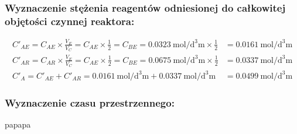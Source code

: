 \documentclass[11pt]{article}
\begin{document}
\subsubsection{Wyznaczenie stężenia reagentów odniesionej do całkowitej objętości czynnej reaktora:}
\begin{align}
{C'}_{AE}=C_{AE}\times\frac{V_E}{V_C}=C_{AE}\times\frac{1}{2}=C_{BE}=\SI{0.0323}{\mole\per\cubic\deci\metre}\times\frac{1}{2}&=\SI{0.0161}{\mole\per\cubic\deci\metre}\\
{C'}_{AR}=C_{AR}\times\frac{V_E}{V_C}=C_{AE}\times\frac{1}{2}=C_{BE}=\SI{0.0675}{\mole\per\cubic\deci\metre}\times\frac{1}{2}&=\SI{0.0337}{\mole\per\cubic\deci\metre}\\
{C'}_A={C'}_{AE}+{C'}_{AR}=\SI{0.0161}{\mole\per\cubic\deci\metre}+\SI{0.0337}{\mole\per\cubic\deci\metre}&=\SI{0.0499}{\mole\per\cubic\deci\metre}
\end{align}
\subsubsection{Wyznaczenie czasu przestrzennego:}
papapa
\end{document}
